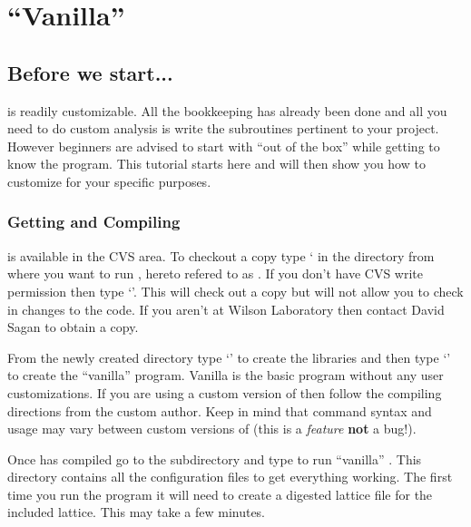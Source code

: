 

\chapter{``Vanilla'' \tao}
\label{c:vanilla_tao}

\section{Before we start...}
\label{s:before_beginning}

\tao is readily customizable. All the bookkeeping has already been done and all
you need to do custom analysis is write the subroutines pertinent to your
project. However beginners are advised to start with
``out of the box'' \tao while getting to know the program. This tutorial starts
here and will then show you
how to customize \tao for your specific purposes.

\subsection{Getting and Compiling \tao}
\label{s:get_and_compile}

\tao is available in the \cesr CVS area. To checkout a copy type ` in the directory from where you want to run \tao, hereto refered to as
. If you don't have \cesr
CVS write permission then type `'. This will check out a copy
but will not allow you to check in changes to the code. If you aren't at Wilson
Laboratory then contact David Sagan  to obtain a copy. 

From the newly created  directory type `' to create the
libraries and then type `' to create
the ``vanilla'' \tao program. Vanilla \tao is the basic \tao program without any
user customizations. If you are using a custom version of \tao then
follow the compiling directions from the custom \tao author. Keep in mind that
command syntax and usage may vary between custom versions of \tao (this is a
\textit{feature} \textbf{not} a bug!).

Once \tao has compiled go to the subdirectory  and type
 to run ``vanilla'' \tao. This directory contains all the
configuration files to get everything working. The first time you run the
program it will need to create a digested \bmad lattice file for the included
lattice. This may take a few minutes.

